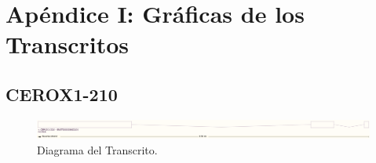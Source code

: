 \documentclass[a4paper,11pt,titlepage]{article}
\theoremstyle{definition}
\begin{document}
\section{Apéndice I: Gráficas de los Transcritos}\label{sec:graphs}

\subsection*{CEROX1-210}\label{subsec:gene1}

\begin{figure}[H]
    \centering
    \includegraphics[width=\textwidth]{images/CEROX1-210.png}
    \caption{Diagrama del Transcrito.}
    \label{fig:CEROX1-210-diag}
\end{figure}
\end{document}
